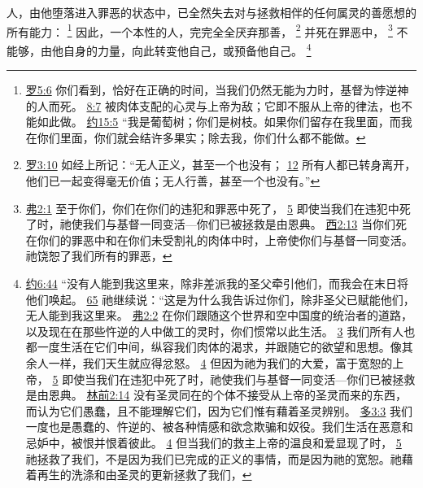 \documentclass[12pt, a4paper, oneside]{ctexart}
\newcounter{parnum}[section]
\newcommand{\N}{%
   \noindent\refstepcounter{parnum}%
    \makebox[\parindent][l]{\textbf{\arabic{parnum}.}}}
\begin{document}
\N 人，由他堕落进入罪恶的状态中，已全然失去对与拯救相伴的任何属灵的善愿想的所有能力：
	\footnote {
		\href{https://biblehub.com/romans/5-6.htm}{罗5:6} 你们看到，恰好在正确的时间，当我们仍然无能为力时，基督为悖逆神的人而死。
		\href{https://biblehub.com/romans/8-7.htm}{8:7} 被肉体支配的心灵与上帝为敌；它即不服从上帝的律法，也不能如此做。
		\href{https://biblehub.com/john/15-5.htm}{约15:5} “我是葡萄树；你们是树枝。如果你们留存在我里面，而我在你们里面，你们就会结许多果实；除去我，你们什么都不能做。
	}
	因此，一个本性的人，完完全全厌弃那善，
	\footnote {
		\href{https://biblehub.com/romans/3-10.htm}{罗3:10} 如经上所记：“无人正义，甚至一个也没有；
		\href{https://biblehub.com/romans/3-12.htm}{12} 所有人都已转身离开，他们已一起变得毫无价值；无人行善，甚至一个也没有。”
	}
	并死在罪恶中，
	\footnote {
		\href{https://biblehub.com/ephesians/2-1.htm}{弗2:1} 至于你们，你们在你们的违犯和罪恶中死了，
		\href{https://biblehub.com/ephesians/2-5.htm}{5} 即使当我们在违犯中死了时，祂使我们与基督一同变活---你们已被拯救是由恩典。
		\href{https://biblehub.com/colossians/2-13.htm}{西2:13} 当你们死在你们的罪恶中和在你们未受割礼的肉体中时，上帝使你们与基督一同变活。祂饶恕了我们所有的罪恶，
	}
	不能够，由他自身的力量，向此转变他自己，或预备他自己。
	\footnote {
		\href{https://biblehub.com/john/6-44.htm}{约6:44} “没有人能到我这里来，除非差派我的圣父牵引他们，而我会在末日将他们唤起。
		\href{https://biblehub.com/john/6-65.htm}{65} 祂继续说：“这是为什么我告诉过你们，除非圣父已赋能他们，无人能到我这里来。
		\href{https://biblehub.com/ephesians/2-2.htm}{弗2:2} 在你们跟随这个世界和空中国度的统治者的道路，以及现在在那些忤逆的人中做工的灵时，你们惯常以此生活。
		\href{https://biblehub.com/ephesians/2-3.htm}{3} 我们所有人也都一度生活在它们中间，纵容我们肉体的渴求，并跟随它的欲望和思想。像其余人一样，我们天生就应得忿怒。
		\href{https://biblehub.com/ephesians/2-4.htm}{4} 但因为祂为我们的大爱，富于宽恕的上帝，
		\href{https://biblehub.com/ephesians/2-5.htm}{5} 即使当我们在违犯中死了时，祂使我们与基督一同变活---你们已被拯救是由恩典。
		\href{https://biblehub.com/1_corinthians/2-14.htm}{林前2:14} 没有圣灵同在的个体不接受从上帝的圣灵而来的东西，而认为它们愚蠢，且不能理解它们，因为它们惟有藉着圣灵辨别。
		\href{https://biblehub.com/titus/3-3.htm}{多3:3} 我们一度也是愚蠢的、忤逆的、被各种情感和欲念欺骗和奴役。我们生活在恶意和忌妒中，被恨并恨着彼此。
		\href{https://biblehub.com/titus/3-4.htm}{4} 但当我们的救主上帝的温良和爱显现了时，
		\href{https://biblehub.com/titus/3-5.htm}{5} 祂拯救了我们，不是因为我们已完成的正义的事情，而是因为祂的宽恕。祂藉着再生的洗涤和由圣灵的更新拯救了我们，
	}
\end{document}
